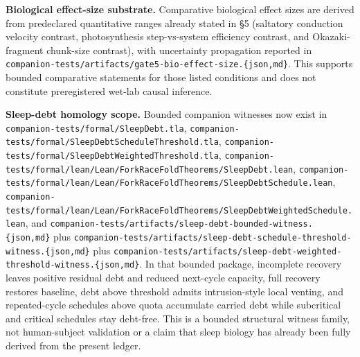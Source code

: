 \documentclass[
  11pt,
]{article}
\begin{document}
\textbf{Biological effect-size substrate.} Comparative biological effect
sizes are derived from predeclared quantitative ranges already stated in
§5 (saltatory conduction velocity contrast, photosynthesis
step-vs-system efficiency contrast, and Okazaki-fragment chunk-size
contrast), with uncertainty propagation reported in
\texttt{companion-\allowbreak{}tests/\allowbreak{}artifacts/\allowbreak{}gate5-\allowbreak{}bio-\allowbreak{}effect-\allowbreak{}size.\allowbreak{}\{json,md\}}.
This supports bounded comparative statements for those listed conditions
and does not constitute preregistered wet-lab causal inference.

\textbf{Sleep-debt homology scope.} Bounded companion witnesses now
exist in \texttt{companion-tests/formal/SleepDebt.tla},
\texttt{companion-\allowbreak{}tests/\allowbreak{}formal/\allowbreak{}SleepDebtScheduleThreshold.\allowbreak{}tla},
\texttt{companion-\allowbreak{}tests/\allowbreak{}formal/\allowbreak{}SleepDebtWeightedThreshold.\allowbreak{}tla},
\texttt{companion-\allowbreak{}tests/\allowbreak{}formal/\allowbreak{}lean/\allowbreak{}Lean/\allowbreak{}ForkRaceFoldTheorems/\allowbreak{}SleepDebt.\allowbreak{}lean},
\texttt{companion-\allowbreak{}tests/\allowbreak{}formal/\allowbreak{}lean/\allowbreak{}Lean/\allowbreak{}ForkRaceFoldTheorems/\allowbreak{}SleepDebtSchedule.\allowbreak{}lean},
\texttt{companion-\allowbreak{}tests/\allowbreak{}formal/\allowbreak{}lean/\allowbreak{}Lean/\allowbreak{}ForkRaceFoldTheorems/\allowbreak{}SleepDebtWeightedSchedule.\allowbreak{}lean},
and
\texttt{companion-\allowbreak{}tests/\allowbreak{}artifacts/\allowbreak{}sleep-\allowbreak{}debt-\allowbreak{}bounded-\allowbreak{}witness.\allowbreak{}\{json,md\}}
plus
\texttt{companion-\allowbreak{}tests/\allowbreak{}artifacts/\allowbreak{}sleep-\allowbreak{}debt-\allowbreak{}schedule-\allowbreak{}threshold-\allowbreak{}witness.\allowbreak{}\{json,md\}}
plus
\texttt{companion-\allowbreak{}tests/\allowbreak{}artifacts/\allowbreak{}sleep-\allowbreak{}debt-\allowbreak{}weighted-\allowbreak{}threshold-\allowbreak{}witness.\allowbreak{}\{json,md\}}.
In that bounded package, incomplete recovery leaves positive residual
debt and reduced next-cycle capacity, full recovery restores baseline,
debt above threshold admits intrusion-style local venting, and
repeated-cycle schedules above quota accumulate carried debt while
subcritical and critical schedules stay debt-free. This is a bounded
structural witness family, not human-subject validation or a claim that
sleep biology has already been fully derived from the present ledger.
\end{document}
